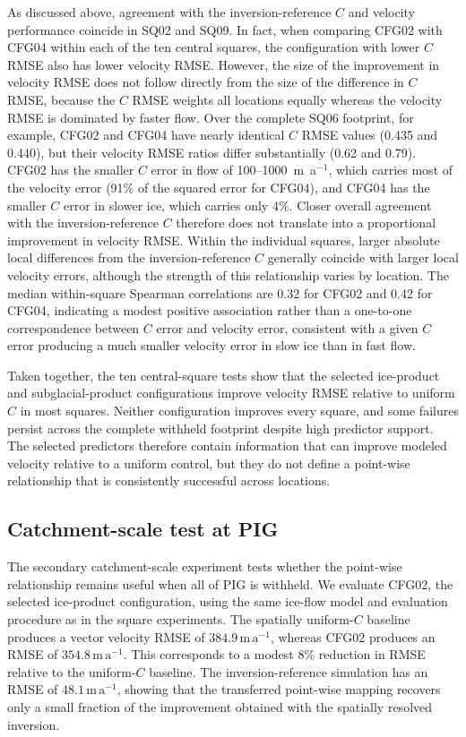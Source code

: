 \documentclass[review,jog]{igs}
\begin{document}
As discussed above, agreement with the inversion-reference $C$ and velocity performance coincide in SQ02 and SQ09. In fact, when comparing CFG02 with CFG04 within each of the ten central squares, the configuration with lower $C$ RMSE also has lower velocity RMSE. However, the size of the improvement in velocity RMSE does not follow directly from the size of the difference in $C$ RMSE, because the $C$ RMSE weights all locations equally whereas the velocity RMSE is dominated by faster flow. Over the complete SQ06 footprint, for example, CFG02 and CFG04 have nearly identical $C$ RMSE values (0.435 and 0.440), but their velocity RMSE ratios differ substantially (0.62 and 0.79). CFG02 has the smaller $C$ error in flow of 100--1000~m~a$^{-1}$, which carries most of the velocity error (91\% of the squared error for CFG04), and CFG04 has the smaller $C$ error in slower ice, which carries only 4\%. Closer overall agreement with the inversion-reference $C$ therefore does not translate into a proportional improvement in velocity RMSE. Within the individual squares, larger absolute local differences from the inversion-reference $C$ generally coincide with larger local velocity errors, although the strength of this relationship varies by location. The median within-square Spearman correlations are 0.32 for CFG02 and 0.42 for CFG04, indicating a modest positive association rather than a one-to-one correspondence between $C$ error and velocity error, consistent with a given $C$ error producing a much smaller velocity error in slow ice than in fast flow.

Taken together, the ten central-square tests show that the selected
ice-product and subglacial-product configurations improve velocity
RMSE relative to uniform $C$ in most squares.
Neither configuration improves every square, and some failures
persist across the complete withheld footprint despite high
predictor support. The selected predictors therefore contain information that can improve modeled velocity relative to a uniform control, but they do not define a point-wise relationship that is consistently successful across locations.

\subsection{Catchment-scale test at PIG}

The secondary catchment-scale experiment tests whether the point-wise relationship remains useful when all of PIG is withheld. We evaluate CFG02, the selected ice-product configuration, using the same ice-flow model and evaluation procedure as in the square experiments. The
spatially uniform-$C$ baseline produces a vector velocity RMSE of
$384.9\,\mathrm{m\,a^{-1}}$, whereas CFG02 produces an RMSE of
$354.8\,\mathrm{m\,a^{-1}}$. This corresponds to a modest 8\% reduction in
RMSE relative to the uniform-$C$ baseline. The inversion-reference simulation has an RMSE of $48.1\,\mathrm{m\,a^{-1}}$, showing that the transferred point-wise mapping recovers only a small fraction of the improvement obtained with the spatially resolved inversion.
\end{document}
